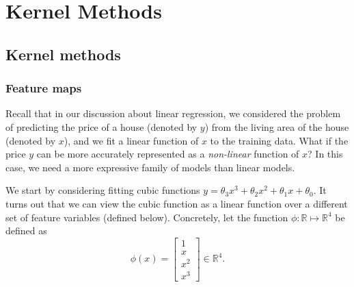 \titlespacing*{\part}{0pt}{-20pt}{30pt} %
\titlespacing*{\chapter}{0pt}{-10pt}{30pt}

\part{Kernel Methods}
\label{part:kernel_methods}


{\let\cleardoublepage\relax \chapter{Kernel methods}}
\section{Feature maps}
Recall that in our discussion about linear regression, we considered the problem
of predicting the price of a house (denoted by $y$) from the living area of
the house (denoted by $x$), and we fit a linear function of $x$ to the training
data. What if the price $y$ can be more accurately represented as a \textit{non-linear}
function of $x$? In this case, we need a more expressive family of models than
linear models.

We start by considering fitting cubic functions $y = \theta_3 x^3 +\theta_2 x^2 +\theta_1 x+\theta_0$.
It turns out that we can view the cubic function as a linear function over
a different set of feature variables (defined below). Concretely, let the %
function $\phi : \mathbb{R} \mapsto \mathbb{R}^4$ be defined as
\begin{equation}\label{eq:feature_map}
    \phi(x) = \begin{bmatrix}
        1\\
        x\\
        x^2\\
        x^3
    \end{bmatrix} \in \mathbb{R}^4.
\end{equation}

